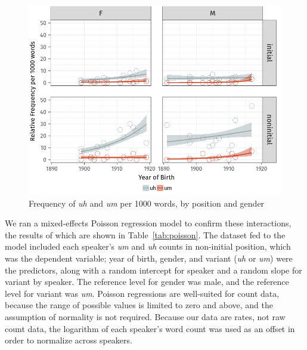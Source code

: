 \documentclass[11pt]{article}
\begin{document}
\begin{figure}[htpb]
    \centering
    \includegraphics[width=0.8\linewidth]{figures/relfreqgenderposition.png}
    \caption{Frequency of \emph{uh} and \emph{um} per 1000 words, by position
    and gender}%
    \label{fig:relfreqgenderposition}
\end{figure}

We ran a mixed-effects Poisson regression model to confirm these interactions,
the results of which are shown in Table~\ref{tab:poisson}.
The dataset fed to the model included each speaker's \emph{um} and \emph{uh}
counts in non-initial position, which was the dependent variable;
year of birth, gender, and variant (\emph{uh} or \emph{um}) were the predictors,
along with a random intercept for speaker and a random slope for variant by
speaker.
The reference level for gender was male, and the reference level for variant
was \emph{um}.
Poisson regressions are well-suited for count data, because the range of
possible values is limited to zero and above, and the assumption of normality is
not required.
Because our data are rates, not raw count data, the logarithm of each speaker's
word count was used as an offset in order to normalize across speakers.
\end{document}
